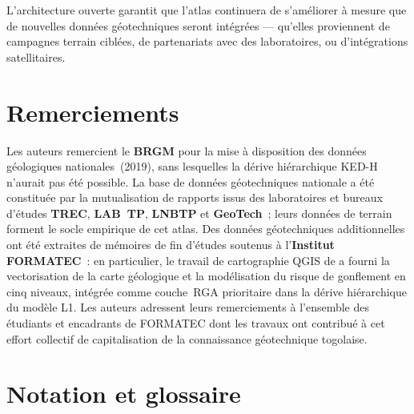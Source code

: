 \documentclass[10pt,a4paper,twocolumn]{article}
\begin{document}
	L'architecture ouverte garantit que l'atlas continuera de s'améliorer
	à mesure que de nouvelles données géotechniques seront intégrées ---
	qu'elles proviennent de campagnes terrain ciblées, de partenariats
	avec des laboratoires, ou d'intégrations satellitaires.
	
	\section*{Remerciements}

	Les auteurs remercient le \textbf{BRGM} pour la mise à disposition
	des données géologiques nationales~(2019), sans lesquelles la
	dérive hiérarchique KED-H n'aurait pas été possible.
	La base de données géotechniques nationale a été constituée par la
	mutualisation de rapports issus des laboratoires et bureaux d'études
	\textbf{TREC}, \textbf{LAB~TP}, \textbf{LNBTP} et \textbf{GeoTech}~;
	leurs données de terrain forment le socle empirique de cet atlas.
	Des données géotechniques additionnelles ont été extraites de mémoires
	de fin d'études soutenus à l'\textbf{Institut FORMATEC}~: en particulier,
	le travail de cartographie QGIS de \textcite{bassafoula2025integration}
	a fourni la vectorisation de la carte géologique et la modélisation
	du risque de gonflement en cinq niveaux, intégrée comme couche~RGA
	prioritaire dans la dérive hiérarchique du modèle L1.
	Les auteurs adressent leurs remerciements à l'ensemble des étudiants
	et encadrants de FORMATEC dont les travaux ont contribué à cet effort
	collectif de capitalisation de la connaissance géotechnique togolaise.
	
	\printbibliography
	
	\appendix

	\section{Notation et glossaire}
	\label{app:notation}
	
\end{document}
